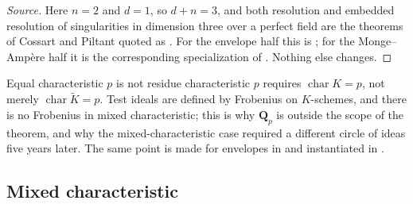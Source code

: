 \begin{proof}[Source]
Here \(n=2\) and \(d=1\), so \(d+n=3\), and both resolution and embedded
resolution of singularities in dimension three over a perfect field are the
theorems of Cossart and Piltant quoted as \cite[Theorem~6.3]{GJKM19}.  For
the envelope half this is ; for the
Monge--Amp\`ere half it is the corresponding specialization of
\cite[Theorem~9.3]{GJKM19}.  Nothing else changes.
\end{proof}

\begin{warning}{Equal characteristic \(p\) is not residue characteristic
\(p\)}
\label{warn:ch29-equal-vs-residue}
 requires
\(\operatorname{char}K=p\), not merely \(\operatorname{char}\widetilde K=p\).
Test ideals are defined by Frobenius on \(K\)-schemes, and there is no
Frobenius in mixed characteristic; this is why \(\mathbf Q_p\) is outside
the scope of the theorem, and why the mixed-characteristic case
 required a different circle of
ideas five years later.  The same point is made for envelopes in
 and instantiated in
.
\end{warning}

\subsection{Mixed characteristic}
\label{sec:ch29-later-mixed}

